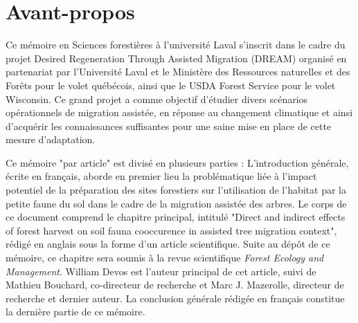 \chapter*{Avant-propos}         %
\label{chap-avantpropos}        %

Ce mémoire en Sciences forestières à l'université Laval s'inscrit dans le cadre du projet Desired Regeneration Through Assisted Migration (DREAM) organisé en partenariat par l'Université Laval et 
le Ministère des Ressources naturelles et des Forêts pour le volet québécois, ainsi que le USDA Forest Service pour le volet Wisconsin.
Ce grand projet a comme objectif d'étudier divers scénarios opérationnels de migration assistée, en réponse au changement climatique et ainsi d'acquérir les connaissances
suffisantes pour une saine mise en place de cette mesure d'adaptation. 

Ce mémoire "par article" est divisé en plusieurs parties : 
L'introduction générale, écrite en français, aborde en premier lieu la problématique liée à l'impact potentiel de la préparation des sites forestiers sur 
l'utilisation de l'habitat par la petite faune du sol dans le cadre de la migration assistée des arbres.
Le corps de ce document comprend le chapitre principal, intitulé 
"Direct and indirect effects of forest harvest on soil fauna cooccurence in assisted tree migration context", rédigé en anglais sous la forme d'un article scientifique. 
Suite au dépôt de ce mémoire, ce chapitre sera soumis à la revue scientifique \textit{Forest Ecology and Management}. 
William Devos est l'auteur principal de cet article, suivi de Mathieu Bouchard, co-directeur de recherche et Marc J. Mazerolle, directeur de recherche et dernier auteur.
La conclusion générale rédigée en français constitue la dernière partie de ce mémoire.
